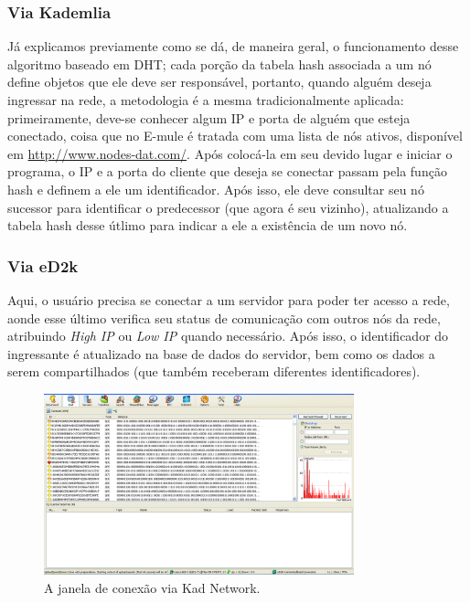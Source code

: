 \documentclass[a4paper]{article}
\begin{document}
		\subsubsection{Via Kademlia}
		Já explicamos previamente como se dá, de maneira geral, o funcionamento desse algoritmo baseado em DHT; cada porção da 
tabela hash associada a um nó define objetos que ele deve ser responsável, portanto, quando alguém deseja ingressar na rede, a metodologia 
é a mesma tradicionalmente aplicada: primeiramente, deve-se conhecer algum IP e porta de alguém que esteja conectado, coisa que no E-mule 
é tratada com uma lista de nós ativos, disponível em \url{http://www.nodes-dat.com/}. Após colocá-la em seu devido lugar e iniciar o 
programa, o IP e a porta do cliente que deseja se conectar passam pela função hash e definem a ele um identificador. Após isso, ele deve 
consultar seu nó sucessor para identificar o predecessor (que agora é seu vizinho), atualizando a tabela hash desse útlimo para indicar a 
ele a existência de um novo nó.

		\subsubsection{Via eD2k}
		Aqui, o usuário precisa se conectar a um servidor para poder ter acesso a rede, aonde esse último verifica seu status de 
comunicação com outros nós da rede, atribuindo \textit{High IP} ou \textit{Low IP} quando necessário. Após isso, o identificador do 
ingressante é atualizado na base de dados do servidor, bem como os dados a serem compartilhados (que também receberam diferentes 
identificadores).

	\begin{figure}[H]
		\centering
		\includegraphics[width=0.8\textwidth]{kadwindow.png}
		\caption{\label{kadwindow}A janela de conexão via Kad Network.}
	\end{figure}
    
\end{document}
